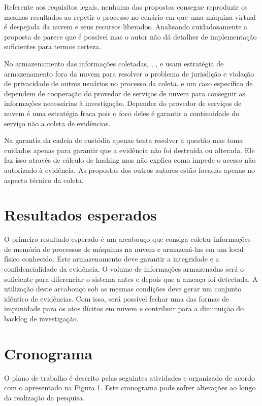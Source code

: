 \documentclass[12pt,				%
	openright,			%
	oneside,			%
	a4paper,			%
	english,			%
	brazil				%
	]{abntex2}
\begin{document}
Referente aos requisitos legais, nenhuma das propostas consegue reproduzir os mesmos resultados ao repetir o processo no cenário em que uma máquina virtual é despejada da nuvem e seus 
recursos liberados. Analisando cuidadosamente a proposta de \cite{George2012} parece que é possível mas o autor não dá detalhes de implementação suficientes para termos certeza.

No armazenamento das informações coletadas, \cite{Reichert2015}, \cite{George2012}, \cite{Poisel2013} e \cite{Dykstra2013} usam estratégia de armazenamento fora da nuvem para 
resolver o problema de jurisdição e violação de privacidade de outros usuários no processo da coleta. \cite{Sang2013} e um caso específico de \cite{George2012} dependem de 
cooperação do provedor de serviços de nuvem para conseguir as informações necessárias à investigação. Depender do provedor de serviços de nuvem é uma estratégia fraca pois o foco
deles é garantir a continuidade do serviço não a coleta de evidências. 

Na garantia da cadeia de custódia apenas \cite{Sang2013} tenta resolver a questão mas toma cuidados apenas para  garantir que a evidência não foi destruída ou alterada. 
Ele faz isso através de cálculo de hashing mas não explica como impede o acesso não autorizado à evidência. As propostas dos outros autores estão focadas apenas no 
aspecto técnico da coleta.

\chapter{Resultados esperados} \label{chap:result}
O primeiro resultado esperado é um arcabouço que consiga coletar informações de memória de processos de máquinas na nuvem e armazená-las em um local físico conhecido.
Este armazenamento deve garantir a integridade e a confidencialidade da evidência. O volume de informações armazenadas será o suficiente para diferenciar o sistema antes 
e depois que a ameaça foi detectada. A utilização deste arcabouço sob as mesmas condições deve gerar um conjunto idêntico de evidências. Com isso, será possível fechar 
uma das formas de impunidade para os atos ilícitos em nuvem e contribuir para a diminuição do backlog de investigação.

\chapter{Cronograma} \label{chap:cronograma}

O plano de trabalho é descrito pelas seguintes atividades e organizado de acordo com o apresentado na Figura 1. Este cronograma pode sofrer alterações ao longo da realização da
pesquisa.
\end{document}
